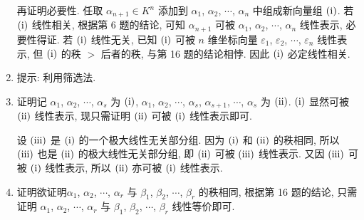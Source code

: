 \begin{enumerate}
        再证明必要性. 任取 $\alpha_{n+1} \in K^n$ 添加到 $\alpha_1$, $\alpha_2$, $\cdots$, $\alpha_n$ 中组成新向量组 $(\mathrm{\uppercase\expandafter{\romannumeral1}})$. 若 $(\mathrm{\uppercase\expandafter{\romannumeral1}})$ 线性相关, 根据{\heiti 第 6 题}的结论, 可知 $\alpha_{n+1}$ 可被 $\alpha_1$, $\alpha_2$, $\cdots$, $\alpha_n$ 线性表示, 必要性得证.
        若 $(\mathrm{\uppercase\expandafter{\romannumeral1}})$ 线性无关, 已知 $(\mathrm{\uppercase\expandafter{\romannumeral1}})$ 可被 $n$ 维坐标向量 $\varepsilon_1$, $\varepsilon_2$, $\cdots$, $\varepsilon_n$ 线性表示, 但 $(\mathrm{\uppercase\expandafter{\romannumeral1}})$ 的秩 $>$ 后者的秩, 与{\heiti 第 16 题}的结论相悖. 因此 $(\mathrm{\uppercase\expandafter{\romannumeral1}})$ 必定线性相关.
    \item %
        提示: 利用筛选法.
    \item %
        {\heiti 证明}\quad 记 $\alpha_1$, $\alpha_2$, $\cdots$, $\alpha_s$ 为 $(\mathrm{\uppercase\expandafter{\romannumeral1}})$,
        $\alpha_1$, $\alpha_2$, $\cdots$, $\alpha_s$, $\alpha_{s+1}$, $\cdots$, $\alpha_s$ 为 $(\mathrm{\uppercase\expandafter{\romannumeral2}})$.
        $(\mathrm{\uppercase\expandafter{\romannumeral1}})$ 显然可被 $(\mathrm{\uppercase\expandafter{\romannumeral2}})$ 线性表示, 现只需证明 $(\mathrm{\uppercase\expandafter{\romannumeral2}})$ 可被 $(\mathrm{\uppercase\expandafter{\romannumeral1}})$ 线性表示即可.

        设 $(\mathrm{\uppercase\expandafter{\romannumeral3}})$ 是 $(\mathrm{\uppercase\expandafter{\romannumeral1}})$ 的一个极大线性无关部分组.
        因为 $(\mathrm{\uppercase\expandafter{\romannumeral1}})$ 和 $(\mathrm{\uppercase\expandafter{\romannumeral2}})$ 的秩相同,
        所以 $(\mathrm{\uppercase\expandafter{\romannumeral3}})$ 也是 $(\mathrm{\uppercase\expandafter{\romannumeral2}})$ 的极大线性无关部分组,
        即 $(\mathrm{\uppercase\expandafter{\romannumeral2}})$ 可被 $(\mathrm{\uppercase\expandafter{\romannumeral3}})$ 线性表示.
        又因 $(\mathrm{\uppercase\expandafter{\romannumeral3}})$ 可被 $(\mathrm{\uppercase\expandafter{\romannumeral1}})$ 线性表示,
        所以 $(\mathrm{\uppercase\expandafter{\romannumeral2}})$ 亦可被 $(\mathrm{\uppercase\expandafter{\romannumeral1}})$ 线性表示.
    \item %
        {\heiti 证明}\quad 欲证明$\alpha_1$, $\alpha_2$, $\cdots$, $\alpha_r$ 与 $\beta_1$, $\beta_2$, $\cdots$, $\beta_r$ 的秩相同,
        根据{\heiti 第 16 题}的结论, 只需证明 $\alpha_1$, $\alpha_2$, $\cdots$, $\alpha_r$ 与 $\beta_1$, $\beta_2$, $\cdots$, $\beta_r$ 线性等价即可.
        

\end{enumerate}
